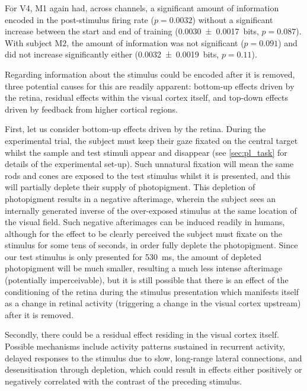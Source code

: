 For \ac{V4}, \ac{M1} again had, across channels, a significant amount of information encoded in the post-stimulus firing rate ($p=0.0032$) without a significant increase between the start and end of training (\SI{+0.0030\pm0.0017}{bits}, $p=0.087$).
With subject \ac{M2}, the amount of information was not significant ($p=0.091$) and did not increase significantly either (\SI{+0.0032\pm0.0019}{bits}, $p=0.11$).


Regarding  information about the stimulus could be encoded after it is removed, three potential causes for this are readily apparent: bottom-up effects driven by the retina, residual effects within the visual cortex itself, and top-down effects driven by feedback from higher cortical regions.

First, let us consider bottom-up effects driven by the retina.
During the experimental trial, the subject must keep their gaze fixated on the central target whilst the sample and test stimuli appear and disappear (see \autoref{sec:pl_task} for details of the experimental set-up).
Such unnatural fixation will mean the same rods and cones are exposed to the test stimulus whilst it is presented, and this will partially deplete their supply of photopigment.
This depletion of photopigment results in a negative afterimage, wherein the subject sees an internally generated inverse of the over-exposed stimulus at the same location of the visual field.
Such negative afterimages can be induced readily in humans, although for the effect to be clearly perceived the subject must fixate on the stimulus for some tens of seconds, in order fully deplete the photopigment.
Since our test stimulus is only presented for \SI{530}{\milli\second}, the amount of depleted photopigment will be much smaller, resulting a much less intense afterimage (potentially imperceivable), but it is still possible that there is an effect of the conditioning of the retina during the stimulus presentation which manifests itself as a change in retinal activity (triggering a change in the visual cortex upstream) after it is removed.


Secondly, there could be a residual effect residing in the visual cortex itself.
Possible mechanisms include activity patterns sustained in recurrent activity, delayed responses to the stimulus due to slow, long-range lateral connections, and desensitisation through depletion, which could result in effects either positively or negatively correlated with the contrast of the preceding stimulus.

